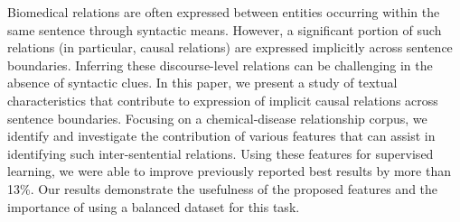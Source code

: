 Biomedical relations are often expressed between entities occurring within the same sentence through syntactic means. However, a significant portion of such relations (in particular, causal relations) are expressed implicitly across sentence boundaries. Inferring these discourse-level relations can be challenging in the absence of syntactic clues. In this paper, we present a study of textual characteristics that contribute to expression of implicit causal relations across sentence boundaries. Focusing on a chemical-disease relationship corpus, we identify and investigate the contribution of various features that can assist in identifying such inter-sentential relations. Using these features for supervised learning, we were able to improve previously reported best results by more than 13\%. Our results demonstrate the usefulness of the proposed features and the importance of using a balanced dataset for this task.

